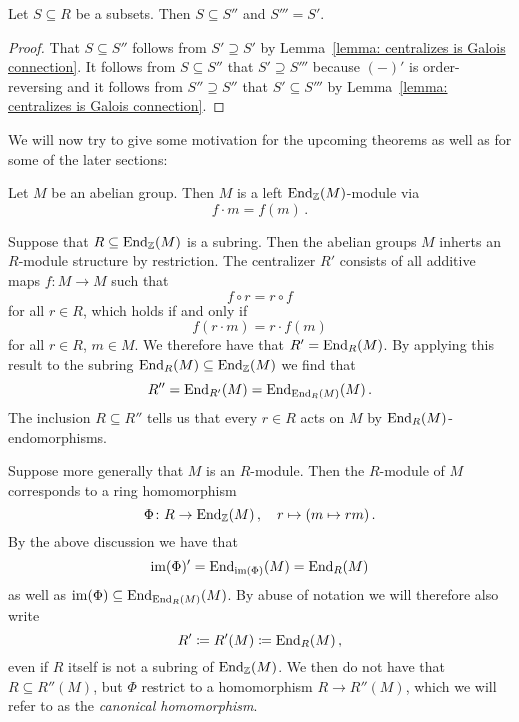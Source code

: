 \begin{corollary}
  Let $S \subseteq R$ be a subsets.
  Then $S \subseteq S''$ and $S''' = S'$.
\end{corollary}


\begin{proof}
  That $S \subseteq S''$ follows from $S' \supseteq S'$ by Lemma~\ref{lemma: centralizes is Galois connection}.
  It follows from $S \subseteq S''$ that $S' \supseteq S'''$ because $(-)'$ is order-reversing and it follows from $S'' \supseteq S''$ that $S' \subseteq S'''$ by Lemma~\ref{lemma: centralizes is Galois connection}.
\end{proof}


\begin{fluff}
  We will now try to give some motivation for the upcoming theorems as well as for some of the later sections:
  
  Let $M$ be an abelian group.
  Then $M$ is a left $\operatorname{End}_{\mathbb{Z}}(M)$-module via
  \[
      f \cdot m
    = f(m) \,.
  \]
  
  Suppose that $R \subseteq \operatorname{End}_{\mathbb{Z}}(M)$ is a subring.
  Then the abelian groups $M$ inherts an $R$-module structure by restriction.
  The centralizer $R'$ consists of all additive maps $f \colon M \to M$ such that
  \[
    f \circ r = r \circ f
  \]
  for all $r \in R$, which holds if and only if
  \[
    f(r \cdot m) = r \cdot f(m)
  \]
  for all $r \in R$, $m \in M$.
  We therefore have that $R' = \operatorname{End}_R(M)$.
  By applying this result to the subring $\operatorname{End}_R(M) \subseteq \operatorname{End}_{\mathbb{Z}}(M)$ we find that
  \[
      R'' 
    = \operatorname{End}_{R'}(M)
    = \operatorname{End}_{\operatorname{End}_R(M)}(M) \,.
  \]
  The inclusion $R \subseteq R''$ tells us that every $r \in R$ acts on $M$ by $\operatorname{End}_R(M)$-endomorphisms.
  
  Suppose more generally that $M$ is an $R$-module.
  Then the $R$-module of $M$ corresponds to a ring homomorphism
  \[
            \Phi
    \colon  R
    \to     \operatorname{End}_{\mathbb{Z}}(M) \,,
    \quad   r
    \mapsto (m \mapsto rm) \,. 
  \]
  By the above discussion we have that
  \[
      \operatorname{im}(\Phi)'
    = \operatorname{End}_{\operatorname{im}(\Phi)}(M)
    = \operatorname{End}_R(M) 
  \]
  as well as $\operatorname{im}(\Phi) \subseteq \operatorname{End}_{\operatorname{End}_R(M)}(M)$.
  By abuse of notation we will therefore also write
  \[
              R'
    \coloneqq  R'(M)
    \coloneqq  \operatorname{End}_R(M) \,,
  \]
  even if $R$ itself is not a subring of $\operatorname{End}_{\mathbb{Z}}(M)$.
  We then do not have that $R \subseteq R''(M)$, but $\Phi$ restrict to a homomorphism $R \to R''(M)$, which we will refer to as the \emph{canonical homomorphism}.
  

\end{fluff}
